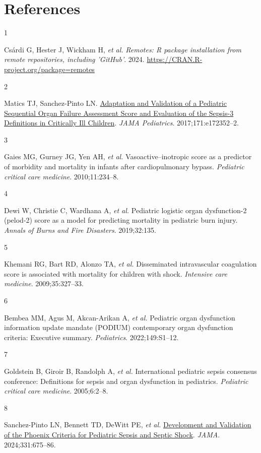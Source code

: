\documentclass[
  letterpaper,
  DIV=11,
  numbers=noendperiod]{scrartcl}
\newlength{\cslhangindent}
\newlength{\csllabelwidth}
\newenvironment{CSLReferences}[2] %
 {\begin{list}{}{%
  \setlength{\itemindent}{0pt}
  \setlength{\leftmargin}{0pt}
  \setlength{\parsep}{0pt}
  \ifodd #1
   \setlength{\leftmargin}{\cslhangindent}
   \setlength{\itemindent}{-1\cslhangindent}
  \fi
  \setlength{\itemsep}{#2\baselineskip}}}
 {\end{list}}
\newcommand{\CSLLeftMargin}[1]{\parbox[t]{\csllabelwidth}{\strut#1\strut}}
\newcommand{\CSLRightInline}[1]{\parbox[t]{\linewidth - \csllabelwidth}{\strut#1\strut}}
\begin{document}
\section*{References}\label{references}

\label{refs}
\begin{CSLReferences}{0}{1}
\CSLLeftMargin{1 }%
\CSLRightInline{Csárdi G, Hester J, Wickham H, \emph{et al.}
\emph{Remotes: R package installation from remote repositories,
including 'GitHub'}. 2024.
\url{https://CRAN.R-project.org/package=remotes}}

\CSLLeftMargin{2 }%
\CSLRightInline{Matics TJ, Sanchez-Pinto LN.
\href{https://doi.org/10.1001/jamapediatrics.2017.2352}{{Adaptation and
Validation of a Pediatric Sequential Organ Failure Assessment Score and
Evaluation of the Sepsis-3 Definitions in Critically Ill Children}}.
\emph{JAMA Pediatrics}. 2017;171:e172352--2.}

\CSLLeftMargin{3 }%
\CSLRightInline{Gaies MG, Gurney JG, Yen AH, \emph{et al.}
Vasoactive--inotropic score as a predictor of morbidity and mortality in
infants after cardiopulmonary bypass. \emph{Pediatric critical care
medicine}. 2010;11:234--8.}

\CSLLeftMargin{4 }%
\CSLRightInline{Dewi W, Christie C, Wardhana A, \emph{et al.} Pediatric
logistic organ dysfunction-2 (pelod-2) score as a model for predicting
mortality in pediatric burn injury. \emph{Annals of Burns and Fire
Disasters}. 2019;32:135.}

\CSLLeftMargin{5 }%
\CSLRightInline{Khemani RG, Bart RD, Alonzo TA, \emph{et al.}
Disseminated intravascular coagulation score is associated with
mortality for children with shock. \emph{Intensive care medicine}.
2009;35:327--33.}

\CSLLeftMargin{6 }%
\CSLRightInline{Bembea MM, Agus M, Akcan-Arikan A, \emph{et al.}
Pediatric organ dysfunction information update mandate (PODIUM)
contemporary organ dysfunction criteria: Executive summary.
\emph{Pediatrics}. 2022;149:S1--12.}

\CSLLeftMargin{7 }%
\CSLRightInline{Goldstein B, Giroir B, Randolph A, \emph{et al.}
International pediatric sepsis consensus conference: Definitions for
sepsis and organ dysfunction in pediatrics. \emph{Pediatric critical
care medicine}. 2005;6:2--8.}

\CSLLeftMargin{8 }%
\CSLRightInline{Sanchez-Pinto LN, Bennett TD, DeWitt PE, \emph{et al.}
\href{https://doi.org/10.1001/jama.2024.0196}{{Development and
Validation of the Phoenix Criteria for Pediatric Sepsis and Septic
Shock}}. \emph{JAMA}. 2024;331:675--86.}

\end{CSLReferences}
\end{document}
